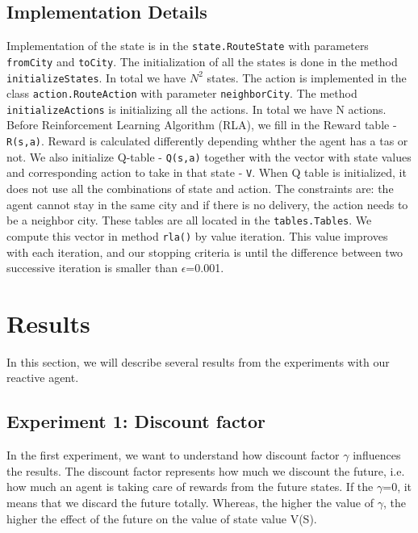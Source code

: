 \documentclass[11pt]{article}
\begin{document}
\subsection{Implementation Details}
Implementation of the state is in the \texttt{state.RouteState} with parameters \texttt{fromCity} and \texttt{toCity}. The initialization of all the states is done in the method \texttt{initializeStates}. In total we have ${N}^2$ states. 
The action is implemented in the class \texttt{action.RouteAction} with parameter \texttt{neighborCity}. The method \texttt{initializeActions} is initializing all the actions. In total we have N actions.
Before Reinforcement Learning Algorithm (RLA), we fill in the Reward table - \texttt{R(s,a)}. Reward is calculated differently depending whther the agent has a tas or not. We also initialize Q-table - \texttt{Q(s,a)} together with the vector with state values and corresponding action to take in that state - \texttt{V}. When Q table is initialized, it does not use all the combinations of state and action. The constraints are: the agent cannot stay in the same city and if there is no delivery, the action needs to be a neighbor city.
These tables are all located in the \texttt{tables.Tables}.
We compute this vector in method \texttt{rla()} by value iteration. This value improves with each iteration, and our stopping criteria is until the difference between two successive iteration is smaller than $\epsilon$=0.001.


\section{Results}
In this section, we will describe several results from the experiments with our reactive agent.

\subsection{Experiment 1: Discount factor}
In the first experiment, we want to understand how discount factor $\gamma$ influences the results. The discount factor represents how much we discount the future, i.e. how much an agent is taking care of rewards from the future states. If the $\gamma$=0, it means that we discard the future totally. Whereas, the higher the value of $\gamma$, the higher the effect of the future on the value of state value V(S). 
\end{document}
